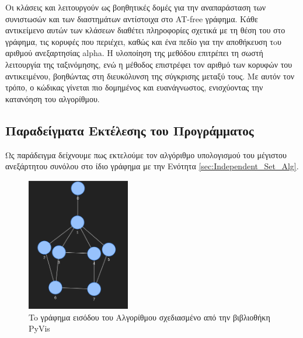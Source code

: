 

Οι κλάσεις  και  λειτουργούν ως βοηθητικές δομές για την αναπαράσταση των συνιστωσών και των διαστημάτων αντίστοιχα στο AT-free γράφημα. Κάθε αντικείμενο αυτών των κλάσεων διαθέτει πληροφορίες σχετικά με τη θέση του στο γράφημα, τις κορυφές που περιέχει, καθώς και ένα πεδίο για την αποθήκευση τoυ αριθμού ανεξαρτησίας alpha. Η υλοποίηση της μεθόδου  επιτρέπει τη σωστή λειτουργία της ταξινόμησης, ενώ η μέθοδος  επιστρέφει τον αριθμό των κορυφών του αντικειμένου, βοηθώντας στη διευκόλυνση της σύγκρισης μεταξύ τους. Με αυτόν τον τρόπο, ο κώδικας γίνεται πιο δομημένος και ευανάγνωστος, ενισχύοντας την κατανόηση του αλγορίθμου.

\subsection{Παραδείγματα Εκτέλεσης του Προγράμματος}

Ως παράδειγμα δείχνουμε πως εκτελούμε τον αλγόριθμο υπολογισμού του μέγιστου ανεξάρτητου συνόλου στο ίδιο γράφημα με την Ενότητα \ref{sec:Independent_Set_Alg}. 
 


\begin{figure}[H]
	\centering
	\includegraphics[width=0.4\textwidth]{pictures/at-free-graph-pyvis.png} 
	\caption{To γράφημα εισόδου του Αλγορίθμου σχεδιασμένο από την βιβλιοθήκη PyVis}
	\label{fig:at-free-graph-pyvis}
\end{figure}


